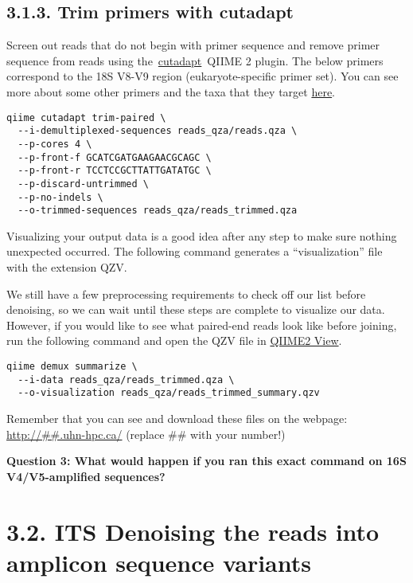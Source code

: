 \documentclass[
]{book}
\begin{document}
\subsection{3.1.3. Trim primers with cutadapt}\label{trim-primers-with-cutadapt-2}

Screen out reads that do not begin with primer sequence and remove primer sequence from reads using the~\href{http://cutadapt.readthedocs.io/en/stable/guide.html}{cutadapt}~QIIME 2 plugin. The below primers correspond to the 18S V8-V9 region (eukaryote-specific primer set). You can see more about some other primers and the taxa that they target \href{https://imr.bio/protocols.html}{here}.

\begin{verbatim}
qiime cutadapt trim-paired \
  --i-demultiplexed-sequences reads_qza/reads.qza \
  --p-cores 4 \
  --p-front-f GCATCGATGAAGAACGCAGC \
  --p-front-r TCCTCCGCTTATTGATATGC \
  --p-discard-untrimmed \
  --p-no-indels \
  --o-trimmed-sequences reads_qza/reads_trimmed.qza
\end{verbatim}

Visualizing your output data is a good idea after any step to make sure nothing unexpected occurred. The following command generates a ``visualization'' file with the extension QZV.

We still have a few preprocessing requirements to check off our list before denoising, so we can wait until these steps are complete to visualize our data. However, if you would like to see what paired-end reads look like before joining, run the following command and open the QZV file in \href{https://view.qiime2.org/}{QIIME2 View}.

\begin{verbatim}
qiime demux summarize \
  --i-data reads_qza/reads_trimmed.qza \
  --o-visualization reads_qza/reads_trimmed_summary.qzv
\end{verbatim}

Remember that you can see and download these files on the webpage: \url{http://\#\#.uhn-hpc.ca/} (replace \#\# with your number!)

\textbf{Question 3: What would happen if you ran this exact command on 16S V4/V5-amplified sequences?}

\section{3.2. ITS Denoising the reads into amplicon sequence variants}\label{its-denoising-the-reads-into-amplicon-sequence-variants}
\end{document}
